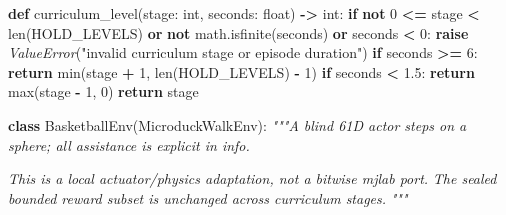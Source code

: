 \documentclass[
  chinese,
  11pt,
  letterpaper,
]{article}
\newenvironment{Shaded}{\begin{snugshade}}{\end{snugshade}}
\newcommand{\BuiltInTok}[1]{#1}
\newcommand{\CommentTok}[1]{\textcolor[rgb]{0.56,0.35,0.01}{\textit{#1}}}
\newcommand{\ControlFlowTok}[1]{\textcolor[rgb]{0.13,0.29,0.53}{\textbf{#1}}}
\newcommand{\DecValTok}[1]{\textcolor[rgb]{0.00,0.00,0.81}{#1}}
\newcommand{\FloatTok}[1]{\textcolor[rgb]{0.00,0.00,0.81}{#1}}
\newcommand{\KeywordTok}[1]{\textcolor[rgb]{0.13,0.29,0.53}{\textbf{#1}}}
\newcommand{\NormalTok}[1]{#1}
\newcommand{\OperatorTok}[1]{\textcolor[rgb]{0.81,0.36,0.00}{\textbf{#1}}}
\newcommand{\PreprocessorTok}[1]{\textcolor[rgb]{0.56,0.35,0.01}{\textit{#1}}}
\newcommand{\StringTok}[1]{\textcolor[rgb]{0.31,0.60,0.02}{#1}}
\renewenvironment{Shaded}{\par\smallskip}{\par\smallskip}
\begin{document}
\begin{Shaded}
\begin{Highlighting}[]
\KeywordTok{def}\NormalTok{ curriculum\_level(stage: }\BuiltInTok{int}\NormalTok{, seconds: }\BuiltInTok{float}\NormalTok{) }\OperatorTok{{-}\textgreater{}} \BuiltInTok{int}\NormalTok{:}
    \ControlFlowTok{if} \KeywordTok{not} \DecValTok{0} \OperatorTok{\textless{}=}\NormalTok{ stage }\OperatorTok{\textless{}} \BuiltInTok{len}\NormalTok{(HOLD\_LEVELS) }\KeywordTok{or} \KeywordTok{not}\NormalTok{ math.isfinite(seconds) }\KeywordTok{or}\NormalTok{ seconds }\OperatorTok{\textless{}} \DecValTok{0}\NormalTok{:}
        \ControlFlowTok{raise} \PreprocessorTok{ValueError}\NormalTok{(}\StringTok{"invalid curriculum stage or episode duration"}\NormalTok{)}
    \ControlFlowTok{if}\NormalTok{ seconds }\OperatorTok{\textgreater{}=} \DecValTok{6}\NormalTok{:}
        \ControlFlowTok{return} \BuiltInTok{min}\NormalTok{(stage }\OperatorTok{+} \DecValTok{1}\NormalTok{, }\BuiltInTok{len}\NormalTok{(HOLD\_LEVELS) }\OperatorTok{{-}} \DecValTok{1}\NormalTok{)}
    \ControlFlowTok{if}\NormalTok{ seconds }\OperatorTok{\textless{}} \FloatTok{1.5}\NormalTok{:}
        \ControlFlowTok{return} \BuiltInTok{max}\NormalTok{(stage }\OperatorTok{{-}} \DecValTok{1}\NormalTok{, }\DecValTok{0}\NormalTok{)}
    \ControlFlowTok{return}\NormalTok{ stage}


\KeywordTok{class}\NormalTok{ BasketballEnv(MicroduckWalkEnv):}
    \CommentTok{"""A blind 61D actor steps on a sphere; all assistance is explicit in info.}

\CommentTok{    This is a local actuator/physics adaptation, not a bitwise mjlab port.}
\CommentTok{    The sealed bounded reward subset is unchanged across curriculum stages.}
\CommentTok{    """}


\end{Highlighting}
\end{Shaded}
\end{document}
